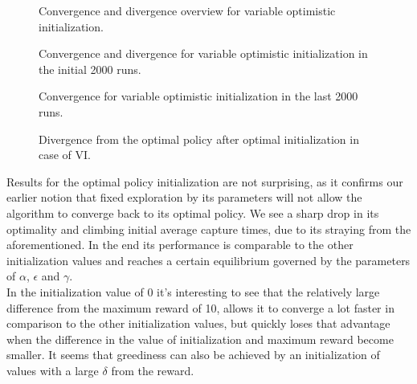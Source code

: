 \documentclass[paper=a4, fontsize=11pt]{scrartcl}
\numberwithin{equation}{section}		%
\numberwithin{figure}{section}			%
\numberwithin{table}{section}				%
\begin{document}
\begin{figure}[H] \centering
\caption{Convergence and divergence overview for variable optimistic initialization.} 
\label{figure:optimisticOverview}
\end{figure}
\begin{figure}[H] \centering
\caption{Convergence and divergence for variable optimistic initialization in the initial 2000 runs.} 
\label{figure:optimisticfirst20}
\end{figure}
\begin{figure}[H] \centering
\caption{Convergence for variable optimistic initialization in the last 2000 runs.} 
\label{figure:optimisticlast20}
\end{figure}
\begin{figure}[H] \centering
\caption{Divergence from the optimal policy after optimal initialization in case of VI.} 
\label{figure:optiOpti}
\end{figure}
Results for the optimal policy initialization are not surprising, as it confirms our earlier notion that fixed exploration by its parameters will not allow the algorithm to converge back to its optimal policy. We see a sharp drop in its optimality and climbing initial average capture times, due to its straying from the aforementioned. In the end its performance is comparable to the other initialization values and reaches a certain equilibrium governed by the parameters of $\alpha$, $\epsilon$ and $\gamma$. \\
In the initialization value of 0 it's interesting to see that the relatively large difference from the maximum reward of 10, allows it to converge a lot faster in comparison to the other initialization values, but quickly loses that advantage when the difference in the value of initialization and maximum reward become smaller. It seems that greediness can also be achieved by an initialization of values with a large $\delta$ from the reward.
\end{document}
